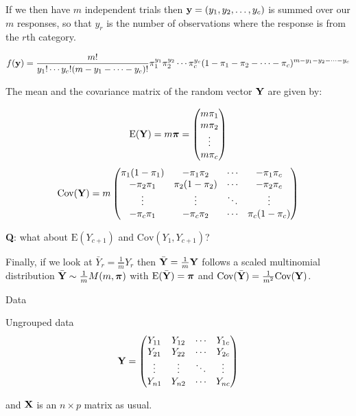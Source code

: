 \documentclass[
  ignorenonframetext,
]{beamer}
\begin{document}
\begin{frame}
If we then have \(m\) independent trials then
\({\bf y}=(y_1,y_2,\ldots,y_c)\) is summed over our \(m\) responses, so
that \(y_r\) is the number of observations where the response is from
the \(r\)th category.

\[f({\bf y})=\frac{m!}{y_1!\cdots y_c! (m-y_1-\cdots -y_c)!}\pi_1^{y_{1}} \pi_2^{y_{2}} \cdots \pi_c^{y_c}(1-\pi_1-\pi_2-\cdots-\pi_c)^{m-y_1-y_2-\cdots-y_c}\]
\end{frame}

\begin{frame}
The mean and the covariance matrix of the random vector \({\bf Y}\) are
given by:

\[\text{E}({\bf Y})=m\boldsymbol{\pi}=\begin{pmatrix}m\pi_1\\m\pi_2\\ \vdots \\ m\pi_c\end{pmatrix}\]
\[\text{Cov}({\bf Y})=m \begin{pmatrix}\pi_1(1-\pi_1)& -\pi_1\pi_2&\cdots &-\pi_1\pi_c\\
-\pi_2\pi_1& \pi_2(1-\pi_2)&\cdots &-\pi_2\pi_c\\
\vdots & \vdots & \ddots & \vdots\\
-\pi_c\pi_1& -\pi_c\pi_2&\cdots & \pi_c(1-\pi_c)\end{pmatrix}\]

\textbf{Q}: what about \(\text{E}(Y_{c+1})\) and
\(\text{Cov}(Y_1,Y_{c+1})\)?
\end{frame}

\begin{frame}
Finally, if we look at \(\bar{Y}_r=\frac{1}{m}Y_r\) then
\(\bar{\bf Y}=\frac{1}{m}{\bf Y}\) follows a scaled multinomial
distribution \(\bar{\bf Y}\sim \frac{1}{m}M(m,{\boldsymbol \pi})\) with
\(\text{E}(\bar{\bf Y})={\boldsymbol \pi}\) and
\(\text{Cov}(\bar{\bf Y})=\frac{1}{m^2}\text{Cov}({\bf Y})\).
\end{frame}

\begin{frame}{Data}
\protect\hypertarget{data}{}
\begin{block}{Ungrouped data}
\protect\hypertarget{ungrouped-data}{}
\[{\bf Y}=\begin{pmatrix} Y_{11}& Y_{12} & \cdots & Y_{1c}\\
Y_{21}& Y_{22} & \cdots & Y_{2c}\\
\vdots & \vdots & \ddots & \vdots\\
Y_{n1}& Y_{n2} & \cdots & Y_{nc}\\
\end{pmatrix}\]

and \({\bf X}\) is an \(n \times p\) matrix as usual.
\end{block}
\end{frame}
\end{document}
